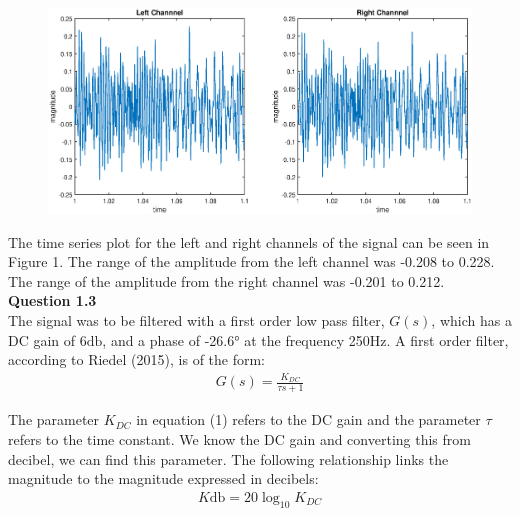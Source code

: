 \documentclass{article}
\begin{document}
    \begin{figure}[H]
    	\includegraphics[scale=0.6]{fig1.eps}
    \end{figure}
    
    The time series plot for the left and right channels of the signal can be seen in Figure 1. The range of the amplitude from the left channel was -0.208 to 0.228. The range of the amplitude from the right channel was -0.201 to 0.212.\\





    
    \textbf{Question 1.3}\\
    
    The signal was to be filtered with a first order low pass filter, $G(s)$, which has a DC gain of 6$\si{\decibel}$, and a phase of -26.6$\si{\degree}$ at the frequency 250$\si{\hertz}$. A first order filter, according to Riedel (2015), is of the form:
    \begin{align}
	    G(s) = \frac{K_{DC}}{\tau s +1}
    \end{align}
    
    The parameter $K_{DC}$ in equation (1) refers to the DC gain and the parameter $\tau$ refers to the time constant. We know the DC gain and converting this from decibel, we can find this parameter. The following relationship links the magnitude to the magnitude expressed in decibels:
    \begin{align*}
	    K\si{\decibel} = 20 \log_{10}K_{DC}
    \end{align*}
    
\end{document}
